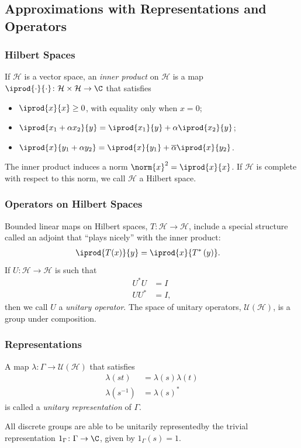 \documentclass{beamer-custom}
\begin{document}
\subsection{Approximations with Representations and Operators}%
\begin{frame}
  \frametitle{Hilbert Spaces}
  If $\mathcal{H}$ is a vector space, an \textit{inner product} on $\mathcal{H}$ is a map $ \iprod{\cdot}{\cdot}\colon \mathcal{H}\times \mathcal{H}\rightarrow \C $ that satisfies
  \begin{itemize}
    \item $ \iprod{x}{x} \geq 0 $, with equality only when $x = 0$;
    \item $ \iprod{x_1 + \alpha x_2}{y} = \iprod{x_1}{y} + \alpha \iprod{x_2}{y} $;
    \item $ \iprod{x}{y_1 + \alpha y_2} = \iprod{x}{y_1} + \overline{\alpha} \iprod{x}{y_2} $.
  \end{itemize}
  The inner product induces a norm $\norm{x}^2 = \iprod{x}{x}$. If $\mathcal{H}$ is complete with respect to this norm, we call $\mathcal{H}$ a Hilbert space.
\end{frame}
\begin{frame}
  \frametitle{Operators on Hilbert Spaces}
  Bounded linear maps on Hilbert spaces, $T\colon \mathcal{H}\rightarrow \mathcal{H}$, include a special structure called an adjoint that ``plays nicely'' with the inner product:
  \begin{align*}
    \iprod{T(x)}{y} &= \iprod{x}{T^{\ast}\left( y \right)}.
  \end{align*}\pause
  If $U\colon \mathcal{H}\rightarrow \mathcal{H}$ is such that
  \begin{align*}
    U^{\ast}U &= I\\
    UU^{\ast} &= I,
  \end{align*}
  then we call $U$ a \textit{unitary operator}. The space of unitary operators, $\mathcal{U}\left( \mathcal{H} \right)$, is a group under composition.
\end{frame}
\begin{frame}
  \frametitle{Representations}
  A map $\lambda\colon \Gamma\rightarrow \mathcal{U}\left( \mathcal{H} \right)$ that satisfies
  \begin{align*}
    \lambda\left( st \right) &= \lambda(s)\lambda(t)\\
    \lambda\left( s^{-1} \right) &= \lambda\left( s \right)^{\ast}
  \end{align*}
  is called a \textit{unitary representation} of $\Gamma$.\newline

  All discrete groups are able to be unitarily represented\pause\:by the trivial representation $1_{\Gamma}\colon \Gamma\rightarrow \C$, given by $1_{\Gamma}(s) = 1$.
\end{frame}
\end{document}
